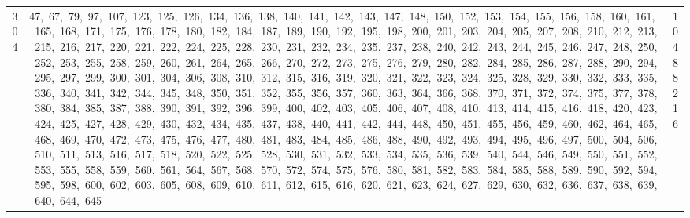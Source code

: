 \begin{longtable}{c|p{}|r}
304 & 47,\ 67,\ 79,\ 97,\ 107,\ 123,\ 125,\ 126,\ 134,\ 136,\ 138,\ 140,\ 141,\ 142,\ 143,\ 147,\ 148,\ 150,\ 152,\ 153,\ 154,\ 155,\ 156,\ 158,\ 160,\ 161,\ 165,\ 168,\ 171,\ 175,\ 176,\ 178,\ 180,\ 182,\ 184,\ 187,\ 189,\ 190,\ 192,\ 195,\ 198,\ 200,\ 201,\ 203,\ 204,\ 205,\ 207,\ 208,\ 210,\ 212,\ 213,\ 215,\ 216,\ 217,\ 220,\ 221,\ 222,\ 224,\ 225,\ 228,\ 230,\ 231,\ 232,\ 234,\ 235,\ 237,\ 238,\ 240,\ 242,\ 243,\ 244,\ 245,\ 246,\ 247,\ 248,\ 250,\ 252,\ 253,\ 255,\ 258,\ 259,\ 260,\ 261,\ 264,\ 265,\ 266,\ 270,\ 272,\ 273,\ 275,\ 276,\ 279,\ 280,\ 282,\ 284,\ 285,\ 286,\ 287,\ 288,\ 290,\ 294,\ 295,\ 297,\ 299,\ 300,\ 301,\ 304,\ 306,\ 308,\ 310,\ 312,\ 315,\ 316,\ 319,\ 320,\ 321,\ 322,\ 323,\ 324,\ 325,\ 328,\ 329,\ 330,\ 332,\ 333,\ 335,\ 336,\ 340,\ 341,\ 342,\ 344,\ 345,\ 348,\ 350,\ 351,\ 352,\ 355,\ 356,\ 357,\ 360,\ 363,\ 364,\ 366,\ 368,\ 370,\ 371,\ 372,\ 374,\ 375,\ 377,\ 378,\ 380,\ 384,\ 385,\ 387,\ 388,\ 390,\ 391,\ 392,\ 396,\ 399,\ 400,\ 402,\ 403,\ 405,\ 406,\ 407,\ 408,\ 410,\ 413,\ 414,\ 415,\ 416,\ 418,\ 420,\ 423,\ 424,\ 425,\ 427,\ 428,\ 429,\ 430,\ 432,\ 434,\ 435,\ 437,\ 438,\ 440,\ 441,\ 442,\ 444,\ 448,\ 450,\ 451,\ 455,\ 456,\ 459,\ 460,\ 462,\ 464,\ 465,\ 468,\ 469,\ 470,\ 472,\ 473,\ 475,\ 476,\ 477,\ 480,\ 481,\ 483,\ 484,\ 485,\ 486,\ 488,\ 490,\ 492,\ 493,\ 494,\ 495,\ 496,\ 497,\ 500,\ 504,\ 506,\ 510,\ 511,\ 513,\ 516,\ 517,\ 518,\ 520,\ 522,\ 525,\ 528,\ 530,\ 531,\ 532,\ 533,\ 534,\ 535,\ 536,\ 539,\ 540,\ 544,\ 546,\ 549,\ 550,\ 551,\ 552,\ 553,\ 555,\ 558,\ 559,\ 560,\ 561,\ 564,\ 567,\ 568,\ 570,\ 572,\ 574,\ 575,\ 576,\ 580,\ 581,\ 582,\ 583,\ 584,\ 585,\ 588,\ 589,\ 590,\ 592,\ 594,\ 595,\ 598,\ 600,\ 602,\ 603,\ 605,\ 608,\ 609,\ 610,\ 611,\ 612,\ 615,\ 616,\ 620,\ 621,\ 623,\ 624,\ 627,\ 629,\ 630,\ 632,\ 636,\ 637,\ 638,\ 639,\ 640,\ 644,\ 645 & 10488216 \\

\end{longtable}
